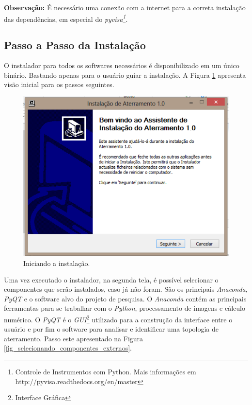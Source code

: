 \documentclass[a4paper, 10pt]{article}
\begin{document}
\textbf{Observação:} É necessário uma conexão com a internet para a correta 
instalação das dependências, em especial do  \textit{pyvisa\footnote{Controle de Instrumentos com Python. Mais informações em http://pyvisa.readthedocs.org/en/master}}.


\subsection{Passo a Passo da Instalação}

O instalador para todos os softwares necessários é disponibilizado em um único
binário. Bastando apenas para o usuário guiar a instalação. A Figura \ref{fig_iniciando_instalacao} apresenta visão inicial para os passos seguintes.

\begin{figure}[!h]
        \caption{\label{fig_iniciando_instalacao}Iniciando a instalação.}
	    \begin{center}
            \includegraphics[scale=0.7]{../fotos/instalacao/parte1_executando.pdf}
	    \end{center}
\end{figure}

Uma vez executado o instalador, na segunda tela, é possível selecionar o componentes 
que serão instalados, caso já não foram. São os principais \textit{Anaconda}, \textit{PyQT} e o software
alvo do projeto de pesquisa. O \textit{Anaconda} contém as principais ferramentas para se
trabalhar com o \textit{Python}, processamento de imagens e cálculo numérico. O \textit{PyQT} é 
o \textit{GUI}\footnote{Interface Gráfica} utilizado para a construção da interface entre o usuário e por fim 
o software para analisar e identificar uma topologia de aterramento. Passo este apresentado 
na Figura \ref{fig_selecionando_componentes_externos}. 
\end{document}

